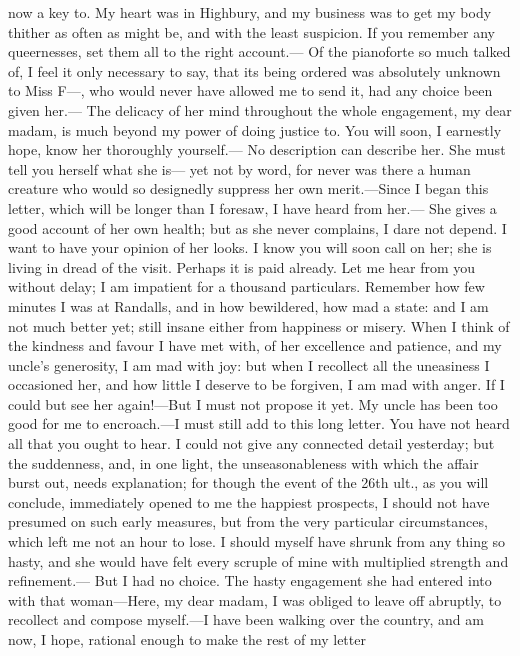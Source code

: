 now a key to.  My heart was in Highbury, and my business was to get
my body thither as often as might be, and with the least suspicion.
If you remember any queernesses, set them all to the right account.---%
Of the pianoforte so much talked of, I feel it only necessary to say,
that its being ordered was absolutely unknown to Miss F---, who would
never have allowed me to send it, had any choice been given her.---%
The delicacy of her mind throughout the whole engagement,
my dear madam, is much beyond my power of doing justice to.
You will soon, I earnestly hope, know her thoroughly yourself.---%
No description can describe her.  She must tell you herself what she is---%
yet not by word, for never was there a human creature who would
so designedly suppress her own merit.---Since I began this letter,
which will be longer than I foresaw, I have heard from her.---%
She gives a good account of her own health; but as she never complains,
I dare not depend.  I want to have your opinion of her looks.
I know you will soon call on her; she is living in dread of the visit.
Perhaps it is paid already.  Let me hear from you without delay;
I am impatient for a thousand particulars.  Remember how few
minutes I was at Randalls, and in how bewildered, how mad a state:
and I am not much better yet; still insane either from happiness
or misery.  When I think of the kindness and favour I have met with,
of her excellence and patience, and my uncle's generosity, I am mad
with joy:  but when I recollect all the uneasiness I occasioned her,
and how little I deserve to be forgiven, I am mad with anger.
If I could but see her again!---But I must not propose it yet.
My uncle has been too good for me to encroach.---I must still add
to this long letter.  You have not heard all that you ought to hear.
I could not give any connected detail yesterday; but the suddenness,
and, in one light, the unseasonableness with which the affair burst out,
needs explanation; for though the event of the 26th ult., as you
will conclude, immediately opened to me the happiest prospects,
I should not have presumed on such early measures, but from the
very particular circumstances, which left me not an hour to lose.
I should myself have shrunk from any thing so hasty, and she would have
felt every scruple of mine with multiplied strength and refinement.---%
But I had no choice.  The hasty engagement she had entered into with
that woman---Here, my dear madam, I was obliged to leave off abruptly,
to recollect and compose myself.---I have been walking over the country,
and am now, I hope, rational enough to make the rest of my letter
